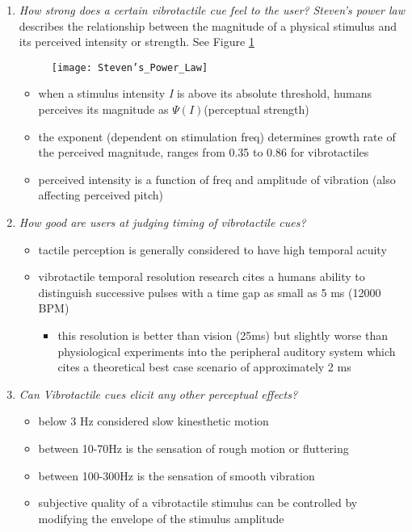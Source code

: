 \begin{enumerate}
    \item \emph{How strong does a certain vibrotactile cue feel to the user?}
\textit{Steven's power law} describes the relationship between the magnitude of a physical stimulus and its perceived intensity or strength. See Figure \ref{fig:StevensPowerLaw}
\begin{figure}[H]
    \texttt{[image: Steven's\_Power\_Law]}
    \label{fig:StevensPowerLaw}
\end{figure}
    \begin{itemize}
        \item when a stimulus intensity \textit{I} is above its absolute threshold, humans perceives its magnitude as \begin{math}\Psi(I)\end{math}(perceptual strength)
        \item the exponent (dependent on stimulation freq) determines growth rate of the perceived magnitude, ranges from 0.35 to 0.86 for vibrotactiles
        \item perceived intensity is a function of freq and amplitude of vibration (also affecting perceived pitch)
    \end{itemize}
    \item \emph{How good are users at judging timing of vibrotactile cues?}
    \begin{itemize}
        \item tactile perception is generally considered to have high temporal acuity
        \item vibrotactile temporal resolution research cites a humans ability to distinguish successive pulses with a time gap as small as 5 ms (12000 BPM)
        \begin{itemize}
            \item this resolution is better than vision (25ms) but slightly worse than physiological experiments into the peripheral auditory system which cites a theoretical best case scenario of approximately 2 ms \cite{fishbach2001auditory}
        \end{itemize}
    \end{itemize}
    \item \emph{Can Vibrotactile cues elicit any other perceptual effects?}
    \begin{itemize}
        \item below 3 Hz considered slow kinesthetic motion
        \item between 10-70Hz is the sensation of rough motion or fluttering
        \item between 100-300Hz is the sensation of smooth vibration
        \item subjective quality of a vibrotactile stimulus can be controlled by modifying the envelope of the stimulus amplitude
    \end{itemize}
\end{enumerate}

